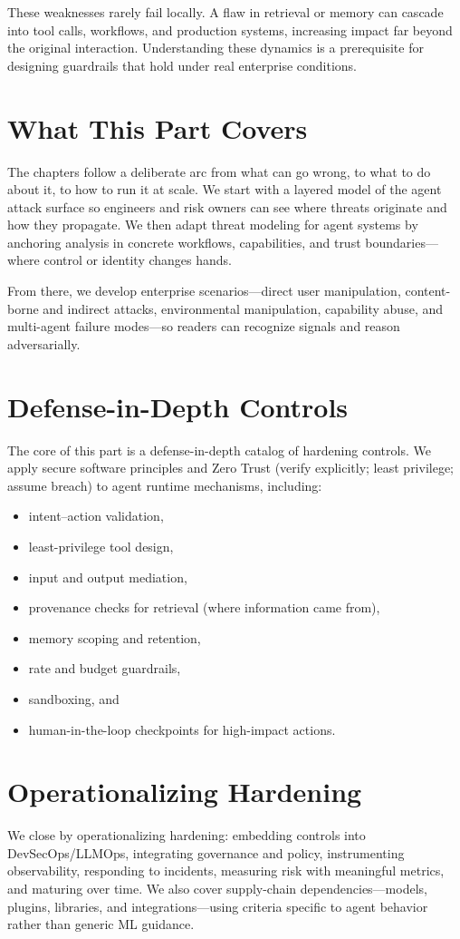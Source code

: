 \begin{TNtwocol}
  These weaknesses rarely fail locally. A flaw in retrieval or memory can cascade into tool calls, workflows, and production systems, increasing impact far beyond the original interaction. Understanding these dynamics is a prerequisite for designing guardrails that hold under real enterprise conditions.

  \section*{What This Part Covers}
  The chapters follow a deliberate arc from what can go wrong, to what to do about it, to how to run it at scale. We start with a layered model of the agent attack surface so engineers and risk owners can see where threats originate and how they propagate. We then adapt threat modeling for agent systems by anchoring analysis in concrete workflows, capabilities, and trust boundaries---where control or identity changes hands.

  From there, we develop enterprise scenarios---direct user manipulation, content-borne and indirect attacks, environmental manipulation, capability abuse, and multi-agent failure modes---so readers can recognize signals and reason adversarially.

  \section*{Defense-in-Depth Controls}
  The core of this part is a defense-in-depth catalog of hardening controls. We apply secure software principles and Zero Trust (verify explicitly; least privilege; assume breach) to agent runtime mechanisms, including:
  \begin{itemize}
    \item intent--action validation,
    \item least-privilege tool design,
    \item input and output mediation,
    \item provenance checks for retrieval (where information came from),
    \item memory scoping and retention,
    \item rate and budget guardrails,
    \item sandboxing, and
    \item human-in-the-loop checkpoints for high-impact actions.
  \end{itemize}

  \section*{Operationalizing Hardening}
  We close by operationalizing hardening: embedding controls into DevSecOps/LLMOps, integrating governance and policy, instrumenting observability, responding to incidents, measuring risk with meaningful metrics, and maturing over time. We also cover supply-chain dependencies---models, plugins, libraries, and integrations---using criteria specific to agent behavior rather than generic ML guidance.


\end{TNtwocol}
